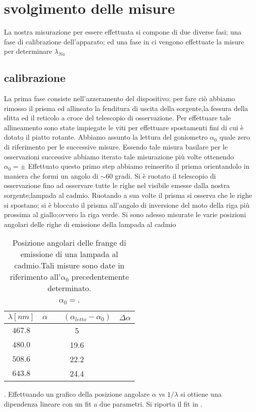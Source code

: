 \section{svolgimento delle misure}
	La nostra misurazione per essere effettuata si compone di due diverse
	fasi; una fase di 
	calibrazione
	dell'apparato; ed una fase in ci vengono 
	effettuate la misure per determinare $\lambda_{Na}$ 
\subsection{calibrazione }
	La prima fase consiste nell'azzeramento del dispositivo;
	per fare ciò abbiamo rimosso il prisma ed allineato la
	fenditura di uscita della sorgente,la fessura della slitta
	ed il reticolo a croce del telescopio di osservazione.
	Per effettuare tale allineamento sono state impiegate 
	le viti per effettuare spostamenti fini di cui è dotato il piatto
	rotante.
	Abbiamo assunto la lettura del goniometro
	$\alpha_0$ quale zero di riferimento per le successive misure.
	Essendo tale misura basilare per le osservazioni successive
	abbiamo iterato tale misurazione più volte
	ottenendo $\alpha_0=	\pm		$
	Effettuato questo primo step abbiamo reinserito il
	prisma orientandolo in maniera che formi un angolo 
	di $\sim 60$ gradi.
	Si è ruotato il telescopio di osservazione fino ad osservare
	tutte le righe nel visibile emesse dalla nostra sorgente;lampada al 
	cadmio.
	Ruotando a sua volte il prisma si osserva che le righe si spostano;
	si è bloccato il prisma all'angolo di inversione del moto
	della riga più prossima al giallo;ovvero la riga verde.
	Si sono adesso misurate le varie posizioni angolari 
	delle righe di emissione della lampada al cadmio
	\bigskip
	\begin{table}[hb]
		\centering
		\begin{tabular}{|c|c|c|}
 		\hline
		$\lambda [nm]$ & $\alpha\qquad(\alpha_{letto}-\alpha_{0})$ &$\Delta \alpha$ \\
  		\hline
		$467.8$  & 5 &  \\
 		$480.0$ & 19.6 &  \\
 		$508.6$ & 22.2 & \\
 		$643.8$ & 24.4 & \\
 		\hline
 		\end{tabular}
		\caption{Posizione angolari delle frange di 
 		emissione di una lampada al cadmio.Tali misure sono
 		date in riferimento all'$\alpha_0$ precedentemente determinato.\\
  		$\alpha_0=	$.}
		\label{tab:disper_angolare}
	\end{table}
	\bigskip
	.
	Effettuando un grafico della posizione angolare 
	$\alpha$ vs $1/\lambda$ si ottiene una
	dipendenza lineare con un fit a due parametri.
	Si riporta il fit in .
	\smallskip

